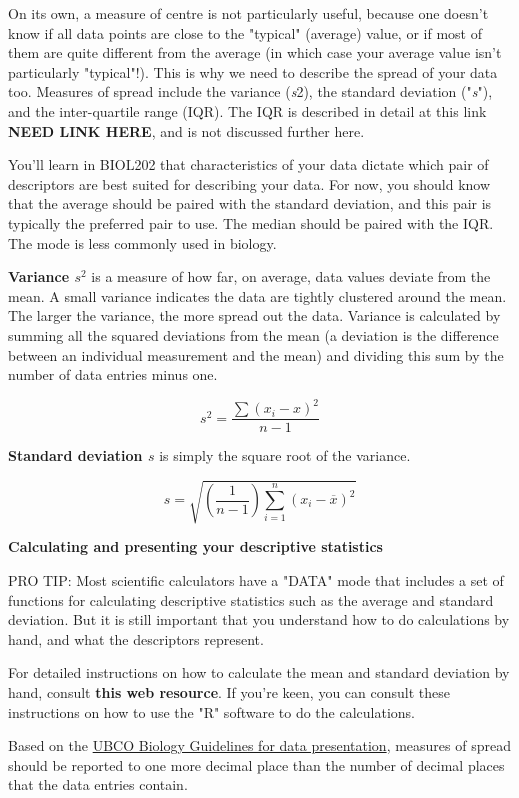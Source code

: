 \documentclass[
]{book}
\begin{document}
On its own, a measure of centre is not particularly useful, because one doesn't know if all data points are close to the "typical" (average) value, or if most of them are quite different from the average (in which case your average value isn't particularly "typical"!). This is why we need to describe the spread of your data too. Measures of spread include the variance (\emph{s}2), the standard deviation ("\emph{s}"), and the inter-quartile range (IQR). The IQR is described in detail at this link \textbf{NEED LINK HERE}, and is not discussed further here.

You'll learn in BIOL202 that characteristics of your data dictate which pair of descriptors are best suited for describing your data. For now, you should know that the average should be paired with the standard deviation, and this pair is typically the preferred pair to use. The median should be paired with the IQR. The mode is less commonly used in biology.

\textbf{Variance \(s{^2}\)} is a measure of how far, on average, data values deviate from the mean. A small variance indicates the data are tightly clustered around the mean. The larger the variance, the more spread out the data. Variance is calculated by summing all the squared deviations from the mean (a deviation is the difference between an individual measurement and the mean) and dividing this sum by the number of data entries minus one.

\[s^{2} =\frac{ \sum{(x_{i}-x)^{2}}}{n-1}\]

\textbf{Standard deviation \(s\)} is simply the square root of the variance.

\[s =\sqrt{(\frac{1}{n-1})\sum_{i=1}^{n}(x_{i}-\overline{x})^{2}}\]

\textbf{Calculating and presenting your descriptive statistics}

PRO TIP: Most scientific calculators have a "DATA" mode that includes a set of functions for calculating descriptive statistics such as the average and standard deviation. But it is still important that you understand how to do calculations by hand, and what the descriptors represent.

For detailed instructions on how to calculate the mean and standard deviation by hand, consult \textbf{this web resource}. If you're keen, you can consult these instructions on how to use the "R" software to do the calculations.

Based on the \href{https://ubco-biology.github.io/Procedures-and-Guidelines/descriptive-summary-statistics.html\%22HYPERLINK\%20\%22https://pages.learning.github.ubc.ca/vdunbar/Procedural-Documents/biology-guidelines-for-data-presentation.html}{UBCO Biology Guidelines for data presentation}, measures of spread should be reported to one more decimal place than the number of decimal places that the data entries contain.
\end{document}
